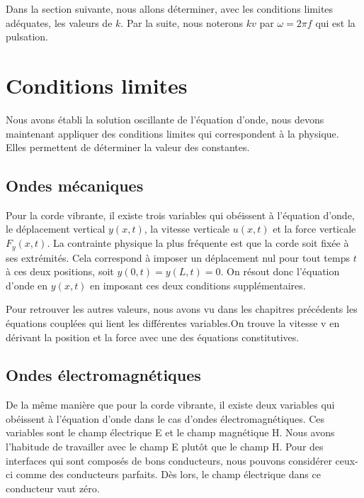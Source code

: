 Dans la section suivante, nous allons déterminer, avec les conditions limites adéquates, les valeurs de $k$. Par la suite, nous noterons $kv$ par $\omega=2\pi f$ qui est la pulsation.

\section{Conditions limites}
Nous avons établi la solution oscillante de l'équation d'onde, nous devons maintenant appliquer des conditions limites qui correspondent à la physique. Elles permettent de déterminer la valeur des constantes.
\subsection{Ondes mécaniques}
Pour la corde vibrante, il existe trois variables qui obéissent à l'équation d'onde, le déplacement vertical $y(x,t)$, la vitesse verticale $u(x,t)$ et la force verticale $F_y(x,t)$. La contrainte physique la plus fréquente est que la corde soit fixée à ses extrémités. Cela correspond à imposer un déplacement nul pour tout temps $t$ à ces deux positions, soit $y(0,t)=y(L,t)=0$. On résout donc l'équation d'onde en $y(x,t)$ en imposant ces deux conditions supplémentaires. 
\par Pour retrouver les autres valeurs, nous avons vu dans les chapitres précédents les équations couplées qui lient les différentes variables.On trouve la vitesse v en dérivant la position et la force avec une des équations constitutives.

\subsection{Ondes électromagnétiques}
De la même manière que pour la corde vibrante, il existe deux variables qui obéissent à l'équation d'onde dans le cas d'ondes électromagnétiques. Ces variables sont le champ électrique E et le champ magnétique H. Nous avons l'habitude de travailler avec le champ E plutôt que le champ H. Pour des interfaces qui sont composés de bons conducteurs, nous pouvons considérer ceux-ci comme des conducteurs parfaits. Dès lors, le champ électrique dans ce conducteur vaut zéro.
